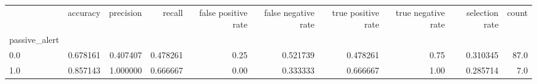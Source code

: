 \begin{tabular}{lrrrrrrrrr}
\toprule
{} &  accuracy &  precision &    recall &  false positive rate &  false negative rate &  true positive rate &  true negative rate &  selection rate &  count \\
passive\_alert &           &            &           &                      &                      &                     &                     &                 &        \\
\midrule
0.0           &  0.678161 &   0.407407 &  0.478261 &                 0.25 &             0.521739 &            0.478261 &                0.75 &        0.310345 &   87.0 \\
1.0           &  0.857143 &   1.000000 &  0.666667 &                 0.00 &             0.333333 &            0.666667 &                1.00 &        0.285714 &    7.0 \\
\bottomrule
\end{tabular}
